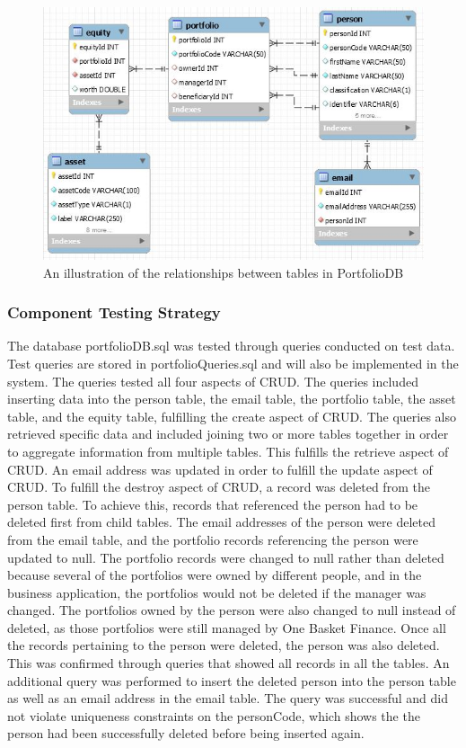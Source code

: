 \documentclass[12pt]{scrartcl} %
\begin{document}
    \graphicspath{{Z:/Design Document/}}
    \begin{figure}[!ht]
        \centering
        \includegraphics[scale=1]{portfolioModel.jpg}
        \caption{An illustration of the relationships between tables in PortfolioDB}
        \label{Figure 1:  Database Tables}
    \end{figure}

    \subsubsection{Component Testing Strategy}

    The database portfolioDB.sql was tested through queries conducted on test data.  Test queries are stored in portfolioQueries.sql and will also be implemented in the system.  The queries tested all four aspects of CRUD.  The queries included inserting data into the person table, the email table, the portfolio table, the asset table, and the equity table, fulfilling the create aspect of CRUD.  The queries also retrieved specific data and included joining two or more tables together in order to aggregate information from multiple tables.  This fulfills the retrieve aspect of CRUD.  An email address was updated in order to fulfill the update aspect of CRUD.  To fulfill the destroy aspect of CRUD, a record was deleted from the person table.  To achieve this, records that referenced the person had to be deleted first from child tables.  The email addresses of the person were deleted from the email table, and the portfolio records referencing the person were updated to null.  The portfolio records were changed to null rather than deleted because several of the portfolios were owned by different people, and in the business application, the portfolios would not be deleted if the manager was changed.  The portfolios owned by the person were also changed to null instead of deleted, as those portfolios were still managed by One Basket Finance.  Once all the records pertaining to the person were deleted, the person was also deleted.  This was confirmed through queries that showed all records in all the tables.  An additional query was performed to insert the deleted person into the person table as well as an email address in the email table.  The query was successful and did not violate uniqueness constraints on the personCode, which shows the the person had been successfully deleted before being inserted again.
\end{document}
